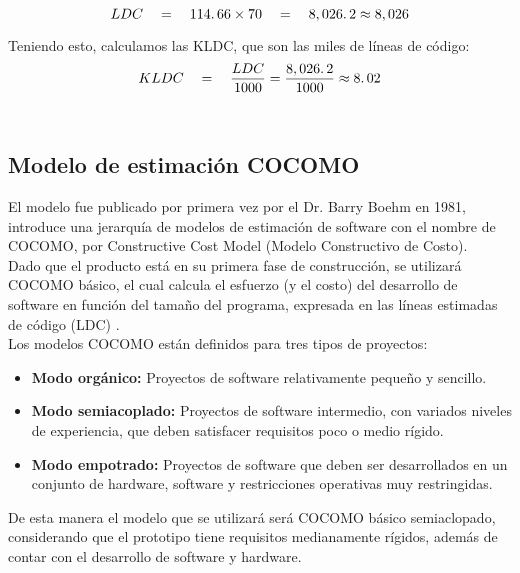 \begin{equation}
	LDC \quad = \quad 114\ldotp66 \times 70 \quad = \quad 8,026\ldotp2 \approx 8,026
\end{equation}

Teniendo esto, calculamos las KLDC, que son las miles de líneas de código: \\

\begin{equation}
	KLDC \quad = \quad \frac{LDC}{1000} = \frac{8,026\ldotp2}{1000} \approx 8\ldotp02
\end{equation} \\

\subsection{Modelo de estimación COCOMO}

El modelo fue publicado por primera vez por el Dr. Barry Boehm en 1981, introduce una jerarquía de modelos de estimación de software con el nombre de COCOMO, por Constructive Cost Model (Modelo Constructivo de Costo). \\

Dado que el producto está en su primera fase de construcción, se utilizará COCOMO básico, el cual calcula el esfuerzo (y el costo) del desarrollo de software en función del tamaño del programa, expresada en las líneas estimadas de código (LDC) \cite{cuarentaytres}. \\

Los modelos COCOMO están definidos para tres tipos de proyectos: 

\begin{itemize}
	\item \textbf{Modo orgánico:} Proyectos de software relativamente pequeño y sencillo.
	\item \textbf{Modo semiacoplado:} Proyectos de software intermedio, con variados niveles de experiencia, que deben satisfacer requisitos poco o medio rígido.
	\item \textbf{Modo empotrado:} Proyectos de software que deben ser desarrollados en un conjunto de hardware, software y restricciones operativas muy restringidas.
\end{itemize}

De esta manera el modelo que se utilizará será COCOMO básico semiaclopado, considerando que el prototipo tiene requisitos medianamente rígidos, además de contar con el desarrollo de software y hardware. \\

